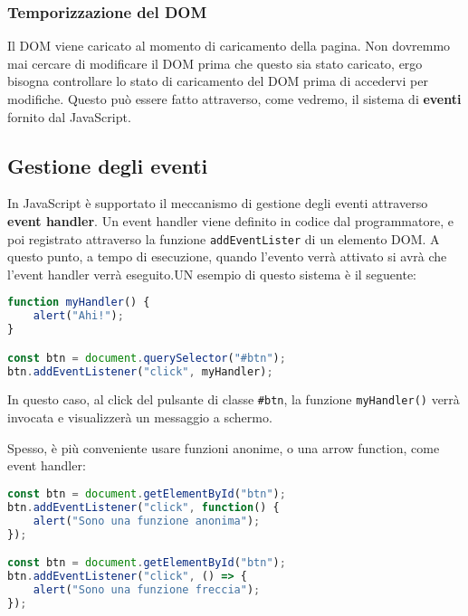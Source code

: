 \documentclass[a4paper,11pt]{article}
\begin{document}
\subsubsection{Temporizzazione del DOM}
Il DOM viene caricato al momento di caricamento della pagina. 
Non dovremmo mai cercare di modificare il DOM prima che questo sia stato caricato, ergo bisogna controllare lo stato di caricamento del DOM prima di accedervi per modifiche.
Questo può essere fatto attraverso, come vedremo, il sistema di \textbf{eventi} fornito dal JavaScript.

\subsection{Gestione degli eventi}
In JavaScript è supportato il meccanismo di gestione degli eventi attraverso \textbf{event handler}.
Un event handler viene definito in codice dal programmatore, e poi registrato attraverso la funzione \lstinline|addEventLister| di un elemento DOM.
A questo punto, a tempo di esecuzione, quando l'evento verrà attivato si avrà che l'event handler verrà eseguito.UN esempio di questo sistema è il seguente:
\begin{lstlisting}[language=javascript, style=codestyle]	
function myHandler() {
	alert("Ahi!");
}

const btn = document.querySelector("#btn");
btn.addEventListener("click", myHandler);
\end{lstlisting}
In questo caso, al click del pulsante di classe \lstinline|#btn|, la funzione \lstinline|myHandler()| verrà invocata e visualizzerà un messaggio a schermo.

Spesso, è più conveniente usare funzioni anonime, o una arrow function, come event handler:
\begin{lstlisting}[language=javascript, style=codestyle]	
const btn = document.getElementById("btn");
btn.addEventListener("click", function() {
	alert("Sono una funzione anonima");
});

const btn = document.getElementById("btn");
btn.addEventListener("click", () => {
	alert("Sono una funzione freccia");
});
\end{lstlisting}
\end{document}
